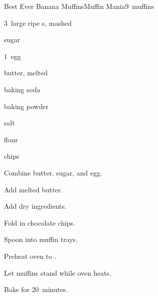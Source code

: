 \begin{recipe}{Best Ever Banana Muffins}{Muffin Mania}{9~muffins}

\begin{ingredients}
\item 3~large ripe s, mashed
\item \C{\threequarter} sugar
\item 1~egg
\item \C{\third} butter, melted
\item {} baking soda
\item {} baking powder
\item \tp{\half} salt
\item \C{1\half} flour
\item \C{\half}  chips
\end{ingredients}

\begin{directions}
\item Combine butter, sugar, and egg.
\item Add melted butter.
\item Add dry ingredients.
\item Fold in chocolate chips.
\item Spoon into muffin trays.
\item Preheat oven to .
\item Let muffins stand while oven heats.
\item Bake for 20~minutes.
\end{directions}

\end{recipe}
